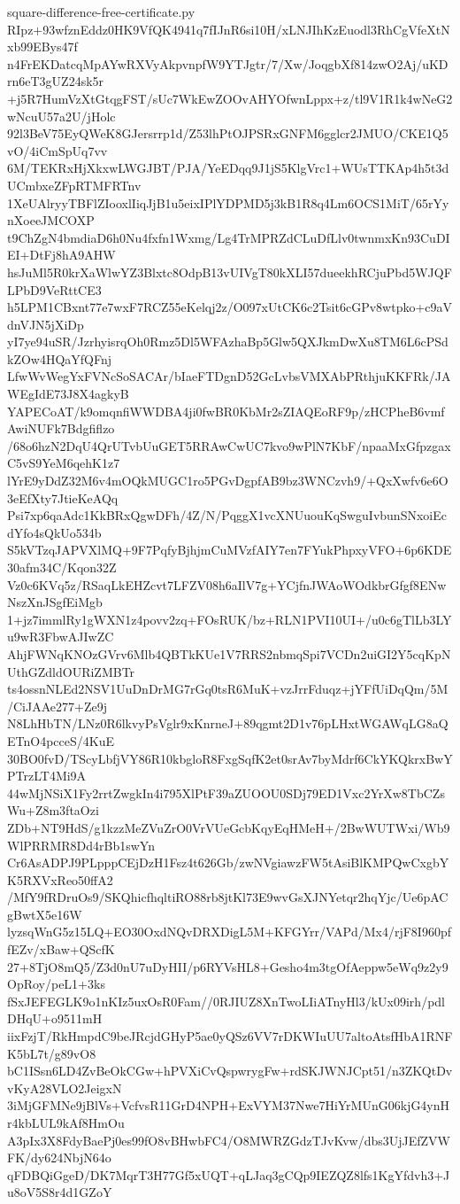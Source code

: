 \documentclass[11pt]{article}
\theoremstyle{definition}
\theoremstyle{remark}
\begin{document}
\begin{filecontents*}[overwrite]{square-difference-free-certificate.py}
RIpz+93wfznEddz0HK9VfQK4941q7fIJnR6si10H/xLNJIhKzEuodl3RhCgVfeXtNxb99EBys47f
n4FrEKDatcqMpAYwRXVyAkpvnpfW9YTJgtr/7/Xw/JoqgbXf814zwO2Aj/uKDrn6eT3gUZ24sk5r
+j5R7HumVzXtGtqgFST/sUc7WkEwZOOvAHYOfwnLppx+z/tl9V1R1k4wNeG2wNcuU57a2U/jHolc
92l3BeV75EyQWeK8GJersrrp1d/Z53lhPtOJPSRxGNFM6gglcr2JMUO/CKE1Q5vO/4iCmSpUq7vv
6M/TEKRxHjXkxwLWGJBT/PJA/YeEDqq9J1jS5KlgVrc1+WUsTTKAp4h5t3dUCmbxeZFpRTMFRTnv
1XeUAlryyTBFlZIooxlIiqJjB1u5eixIPlYDPMD5j3kB1R8q4Lm6OCS1MiT/65rYynXoeeJMCOXP
t9ChZgN4bmdiaD6h0Nu4fxfn1Wxmg/Lg4TrMPRZdCLuDfLlv0twnmxKn93CuDIEI+DtFj8hA9AHW
hsJuMl5R0krXaWlwYZ3Blxtc8OdpB13vUIVgT80kXLI57dueekhRCjuPbd5WJQFLPbD9VeRttCE3
h5LPM1CBxnt77e7wxF7RCZ55eKelqj2z/O097xUtCK6c2Tsit6cGPv8wtpko+c9aVdnVJN5jXiDp
yI7ye94uSR/JzrhyisrqOh0Rmz5Dl5WFAzhaBp5Glw5QXJkmDwXu8TM6L6cPSdkZOw4HQaYfQFnj
LfwWvWegYxFVNcSoSACAr/bIaeFTDgnD52GcLvbsVMXAbPRthjuKKFRk/JAWEgIdE73J8X4agkyB
YAPECoAT/k9omqnfiWWDBA4ji0fwBR0KbMr2sZIAQEoRF9p/zHCPheB6vmfAwiNUFk7Bdgfiflzo
/68o6hzN2DqU4QrUTvbUuGET5RRAwCwUC7kvo9wPlN7KbF/npaaMxGfpzgaxC5vS9YeM6qehK1z7
lYrE9yDdZ32M6v4mOQkMUGC1ro5PGvDgpfAB9bz3WNCzvh9/+QxXwfv6e6O3eEfXty7JtieKeAQq
Psi7xp6qaAdc1KkBRxQgwDFh/4Z/N/PqggX1vcXNUuouKqSwguIvbunSNxoiEcdYfo4sQkUo534b
S5kVTzqJAPVXlMQ+9F7PqfyBjhjmCuMVzfAIY7en7FYukPhpxyVFO+6p6KDE30afm34C/Kqon32Z
Vz0c6KVq5z/RSaqLkEHZcvt7LFZV08h6aIlV7g+YCjfnJWAoWOdkbrGfgf8ENwNszXnJSgfEiMgb
1+jz7immlRy1gWXN1z4povv2zq+FOsRUK/bz+RLN1PVI10UI+/u0c6gTlLb3LYu9wR3FbwAJIwZC
AhjFWNqKNOzGVrv6Mlb4QBTkKUe1V7RRS2nbmqSpi7VCDn2uiGI2Y5cqKpNUthGZdldOURiZMBTr
ts4ossnNLEd2NSV1UuDnDrMG7rGq0tsR6MuK+vzJrrFduqz+jYFfUiDqQm/5M/CiJAAe277+Ze9j
N8LhHbTN/LNz0R6lkvyPsVglr9xKnrneJ+89qgmt2D1v76pLHxtWGAWqLG8aQETnO4pcceS/4KuE
30BO0fvD/TScyLbfjVY86R10kbgloR8FxgSqfK2et0srAv7byMdrf6CkYKQkrxBwYPTrzLT4Mi9A
44wMjNSiX1Fy2rrtZwgkIn4i795XlPtF39aZUOOU0SDj79ED1Vxc2YrXw8TbCZsWu+Z8m3ftaOzi
ZDb+NT9HdS/g1kzzMeZVuZrO0VrVUeGcbKqyEqHMeH+/2BwWUTWxi/Wb9WlPRRMR8Dd4rBb1swYn
Cr6AsADPJ9PLpppCEjDzH1Fsz4t626Gb/zwNVgiawzFW5tAsiBlKMPQwCxgbYK5RXVxReo50ffA2
/MfY9fRDruOs9/SKQhicfhqltiRO88rb8jtKl73E9wvGsXJNYetqr2hqYjc/Ue6pACgBwtX5e16W
lyzsqWnG5z15LQ+EO30OxdNQvDRXDigL5M+KFGYrr/VAPd/Mx4/rjF8I960pffEZv/xBaw+QScfK
27+8TjO8mQ5/Z3d0nU7uDyHII/p6RYVsHL8+Gesho4m3tgOfAeppw5eWq9z2y9OpRoy/peL1+3ks
fSxJEFEGLK9o1nKIz5uxOsR0Fam//0RJIUZ8XnTwoLIiATnyHl3/kUx09irh/pdlDHqU+o9511mH
iixFzjT/RkHmpdC9beJRcjdGHyP5ae0yQSz6VV7rDKWIuUU7altoAtsfHbA1RNFK5bL7t/g89vO8
bC1ISsn6LD4ZvBeOkCGw+hPVXiCvQspwrygFw+rdSKJWNJCpt51/n3ZKQtDvvKyA28VLO2JeigxN
3iMjGFMNe9jBlVs+VcfvsR11GrD4NPH+ExVYM37Nwe7HiYrMUnG06kjG4ynHr4kbLUL9kAf8HmOu
A3pIx3X8FdyBaePj0es99fO8vBHwbFC4/O8MWRZGdzTJvKvw/dbs3UjJEfZVWFK/dy624NbjN64o
qFDBQiGgeD/DK7MqrT3H77Gf5xUQT+qLJaq3gCQp9IEZQZ8lfs1KgYfdvh3+Ju8oV5S8r4d1GZoY

\end{filecontents*}
\end{document}
